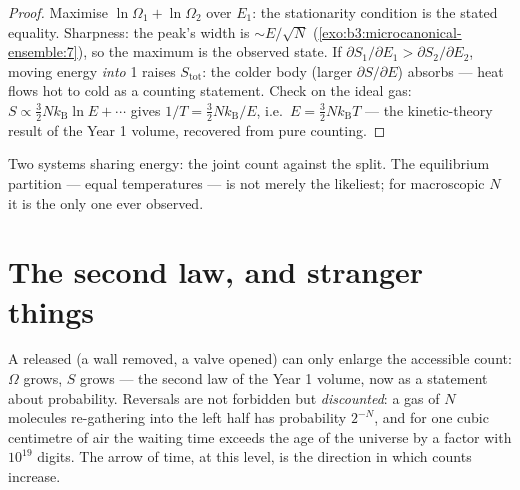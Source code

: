 \begin{proof}
Maximise $\ln\Omega_1 + \ln\Omega_2$ over $E_1$: the stationarity
condition is the stated equality. Sharpness: the peak's width is
$\sim E/\sqrt N$ (\cref{exo:b3:microcanonical-ensemble:7}), so the
maximum is the observed state. If $\partial S_1/\partial E_1 >
\partial S_2/\partial E_2$, moving energy \emph{into} 1 raises
$S_{\text{tot}}$: the colder body (larger $\partial S/\partial E$)
absorbs --- heat flows hot to cold as a counting statement. Check
on the ideal gas: $S \propto \tfrac32 Nk_{\text{B}}\ln E + \cdots$
gives $1/T = \tfrac32 Nk_{\text{B}}/E$, i.e.\ $E = \tfrac32
Nk_{\text{B}}T$ --- the kinetic-theory result of the Year 1 volume,
recovered from pure counting.
\end{proof}

\begin{omfigure}

{\small Two systems sharing energy: the joint count against the
split. The equilibrium partition --- equal temperatures --- is not
merely the likeliest; for macroscopic $N$ it is the only one ever
observed.}
\end{omfigure}

\section{The second law, and stranger things}

\begin{proposition}\label{prop:b3:microcanonical-ensemble:second-law}
A  released (a wall removed, a valve opened) can only
enlarge the accessible count: $\Omega$ grows, $S$ grows --- the
second law of the Year 1 volume, now as a statement about
probability. Reversals are not forbidden but \emph{discounted}: a
gas of $N$ molecules re-gathering into the left half has probability
$2^{-N}$, and for one cubic centimetre of air the waiting time
exceeds the age of the universe by a factor with $10^{19}$ digits.
The arrow of time, at this level, is the direction in which counts
increase.
\end{proposition}


